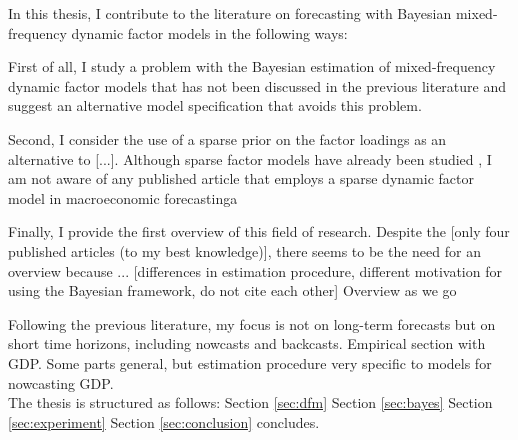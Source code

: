 

In this thesis, I contribute to the literature on forecasting with Bayesian mixed-frequency dynamic factor models in the following ways:

First of all, I study a problem with the Bayesian estimation of mixed-frequency dynamic factor models that has not been discussed in the previous literature and suggest an alternative model specification that avoids this problem.

Second, I consider the use of a sparse prior on the factor loadings as an alternative to [...]. Although sparse factor models have already been studied \citep{KaufmannSchumacher2017} %
, I am not aware of any published article that employs a sparse dynamic factor model in macroeconomic forecastinga

Finally, I provide the first overview of this field of research. Despite the [only four published articles (to my best knowledge)], there seems to be the need for an overview because ... [differences in estimation procedure, different motivation for using the Bayesian framework, do not cite each other] Overview as we go

Following the previous literature, my focus is not on long-term forecasts but on short time horizons, including nowcasts and backcasts. Empirical section with GDP. Some parts general, but estimation procedure very specific to models for nowcasting GDP. \\


The thesis is structured as follows: Section \ref{sec:dfm} Section \ref{sec:bayes} Section \ref{sec:experiment} Section \ref{sec:conclusion} concludes.
